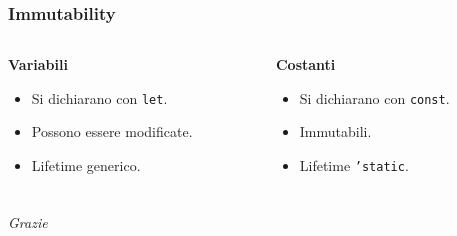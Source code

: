 \documentclass{beamer}
\newcommand{\textcode}[1]{\colorbox{backcolour}{\texttt{#1}}}
\begin{document}


\begin{frame}
    \frametitle{Immutability}
    \begin{columns}
        \begin{column}{0.5\textwidth}
            \textbf{Variabili}
            \begin{itemize}
                \item Si dichiarano con \textcode{let}.
                \item Possono essere modificate.
                \item Lifetime generico.
            \end{itemize}
        \end{column}

        \begin{column}{0.5\textwidth}
            \textbf{Costanti}
            \begin{itemize}
                \item Si dichiarano con \textcode{const}.
                \item Immutabili.
                \item Lifetime \textcode{'static}.
            \end{itemize}
        \end{column}
    \end{columns}
\end{frame}

\begin{frame}
    \frametitle{}
    \centering \huge
    \emph{Grazie}
\end{frame}
\end{document}
